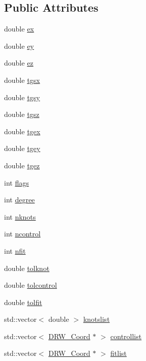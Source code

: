 \subsection*{Public Attributes}
\begin{DoxyCompactItemize}
\item 
double \hyperlink{classDRW__Spline_a7d2455d56e3de91a85a7afd1a5b34dfe}{ex}
\item 
double \hyperlink{classDRW__Spline_a937a3c0c4450e383de5ebbbbc892d1ad}{ey}
\item 
double \hyperlink{classDRW__Spline_ad3ad8a265fbc8c07bc06f8939a8a31a6}{ez}
\item 
double \hyperlink{classDRW__Spline_af669678833d9334001f372ef3e459063}{tgsx}
\item 
double \hyperlink{classDRW__Spline_a0d22ecfcfa1ccdf83d3799555b808fb6}{tgsy}
\item 
double \hyperlink{classDRW__Spline_a432ab2ee17f00fe8c3537f3ab12f0524}{tgsz}
\item 
double \hyperlink{classDRW__Spline_ae6195201183d629d458d820417587197}{tgex}
\item 
double \hyperlink{classDRW__Spline_a5bbb13c6219350335c353b86755adcea}{tgey}
\item 
double \hyperlink{classDRW__Spline_acfe280748cc843881dffd17430a2be37}{tgez}
\item 
int \hyperlink{classDRW__Spline_a49110f44d95d47090449c56beaaac3ca}{flags}
\item 
int \hyperlink{classDRW__Spline_af60e9efc3c39f418196cca4cc9f8125b}{degree}
\item 
int \hyperlink{classDRW__Spline_a5dd173d8176de55d07f00d96dedb0201}{nknots}
\item 
int \hyperlink{classDRW__Spline_a73dcf2fa67f1029e4a8d6577b5b51656}{ncontrol}
\item 
int \hyperlink{classDRW__Spline_aa9269fcfa581a0e0b25a84fb8dddc96c}{nfit}
\item 
double \hyperlink{classDRW__Spline_a62139497f4127ed0d909cbe6cb7d5304}{tolknot}
\item 
double \hyperlink{classDRW__Spline_a9ebcea64002b14f0adfae66eadd9f24a}{tolcontrol}
\item 
double \hyperlink{classDRW__Spline_a8f91c72942350988a2c3b4652162d613}{tolfit}
\item 
std\-::vector$<$ double $>$ \hyperlink{classDRW__Spline_a90bf2f53cd19d98629e393f3cdd36c95}{knotslist}
\item 
std\-::vector$<$ \hyperlink{classDRW__Coord}{D\-R\-W\-\_\-\-Coord} $\ast$ $>$ \hyperlink{classDRW__Spline_a37b5e6ce7e32c1577fed59c3704c0e0f}{controllist}
\item 
std\-::vector$<$ \hyperlink{classDRW__Coord}{D\-R\-W\-\_\-\-Coord} $\ast$ $>$ \hyperlink{classDRW__Spline_aeefb7618b8c983a9abe32f974c8ca852}{fitlist}
\end{DoxyCompactItemize}
